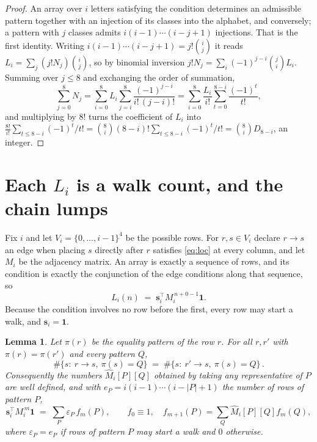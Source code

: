 \documentclass[11pt,a4paper]{article}
\theoremstyle{plain}
\newtheorem{lemma}[theorem]{Lemma}
\theoremstyle{definition}
\begin{document}
\begin{proof}
An array over $i$ letters satisfying the condition determines an admissible pattern together
with an injection of its classes into the alphabet, and conversely; a pattern with $j$
classes admits $i(i-1)\cdots(i-j+1)$ injections. That is the first identity. Writing
$i(i-1)\cdots(i-j+1)=j!\binom{i}{j}$ it reads $L_i=\sum_j (j!N_j)\binom{i}{j}$, so by
binomial inversion $j!N_j=\sum_{i}(-1)^{j-i}\binom{j}{i}L_i$. Summing over
$j\le 8$ and exchanging the order of summation,
\[
\sum_{j=0}^{8}N_j=\sum_{i=0}^{8}L_i\sum_{j=i}^{8}\frac{(-1)^{j-i}}{i!\,(j-i)!}
=\sum_{i=0}^{8}\frac{L_i}{i!}\sum_{t=0}^{8-i}\frac{(-1)^t}{t!} ,
\]
and multiplying by $8!$ turns the coefficient of $L_i$ into
$\frac{8!}{i!}\sum_{t\le 8-i}(-1)^t/t!=\binom{8}{i}(8-i)!\sum_{t\le 8-i}(-1)^t/t!
=\binom{8}{i}D_{8-i}$, an integer.
\end{proof}

\section{Each $L_i$ is a walk count, and the chain lumps}

Fix $i$ and let $V_i=\{0,\dots,i-1\}^{4}$ be the possible rows. For $r,s\in V_i$
declare $r\to s$ an edge when placing $s$ directly after $r$ satisfies \eqref{eq:loc} at
every column, and let $M_i$ be the adjacency matrix. An array is exactly a sequence of
rows, and its condition is exactly the conjunction of the edge conditions along that
sequence, so
\[
L_i(n)\;=\;\mathbf{s}_i^{\!\top}M_i^{\,n+0-1}\mathbf{1} .
\]
Because the condition involves no row before the first, every
row may start a walk, and $\mathbf{s}_i=\mathbf{1}$.

\begin{lemma}\label{lem:lump}
Let $\pi(r)$ be the equality pattern of the row $r$. For all $r,r'$ with
$\pi(r)=\pi(r')$ and every pattern $Q$,
\[
\#\{s:\ r\to s,\ \pi(s)=Q\}\;=\;\#\{s:\ r'\to s,\ \pi(s)=Q\}\, .
\]
Consequently the numbers $\widehat M_i[P][Q]$ obtained by taking any representative of $P$
are well defined, and with $e_P=i(i-1)\cdots(i-|P|+1)$ the number of rows of pattern $P$,
\[
\mathbf{s}_i^{\!\top}M_i^{\,m}\mathbf{1}\;=\;\sum_P \varepsilon_P\,f_m(P),
\qquad f_0\equiv1,\quad f_{m+1}(P)=\sum_Q\widehat M_i[P][Q]f_m(Q),
\]
where $\varepsilon_P=e_P$ if rows of pattern $P$ may start a walk and $0$ otherwise.
\end{lemma}
\end{document}
